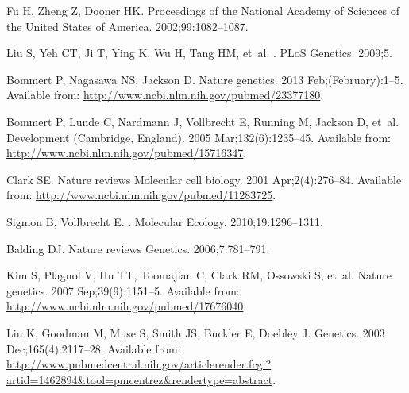 \documentclass[10pt,letterpaper]{article}
\providecommand{\DIFaddbegin}{} %
\begin{document}
\begin{thebibliography}{}
Fu H, Zheng Z, Dooner HK.
\newblock Proceedings of the National Academy of Sciences of the United States
  of America. 2002;99:1082--1087.

Liu S, Yeh CT, Ji T, Ying K, Wu H, Tang HM, et~al.
.
\newblock PLoS Genetics. 2009;5.

Bommert P, Nagasawa NS, Jackson D.
\newblock Nature genetics. 2013 Feb;(February):1--5.
\newblock Available from: \url{http://www.ncbi.nlm.nih.gov/pubmed/23377180}.

Bommert P, Lunde C, Nardmann J, Vollbrecht E, Running M, Jackson D, et~al.
\newblock Development (Cambridge, England). 2005 Mar;132(6):1235--45.
\newblock Available from: \url{http://www.ncbi.nlm.nih.gov/pubmed/15716347}.

Clark SE.
\newblock Nature reviews Molecular cell biology. 2001 Apr;2(4):276--84.
\newblock Available from: \url{http://www.ncbi.nlm.nih.gov/pubmed/11283725}.

Sigmon B, Vollbrecht E.
.
\newblock Molecular Ecology. 2010;19:1296--1311.

Balding DJ.
\newblock Nature reviews Genetics. 2006;7:781--791.

Kim S, Plagnol V, Hu TT, Toomajian C, Clark RM, Ossowski S, et~al.
\newblock Nature genetics. 2007 Sep;39(9):1151--5.
\newblock Available from: \url{http://www.ncbi.nlm.nih.gov/pubmed/17676040}.

Liu K, Goodman M, Muse S, Smith JS, Buckler E, Doebley J.
\newblock Genetics. 2003 Dec;165(4):2117--28.
\newblock Available from:
  \url{http://www.pubmedcentral.nih.gov/articlerender.fcgi?artid=1462894\&tool=pmcentrez\&rendertype=abstract}.

\end{thebibliography}
\DIFaddbegin 
\end{document}
